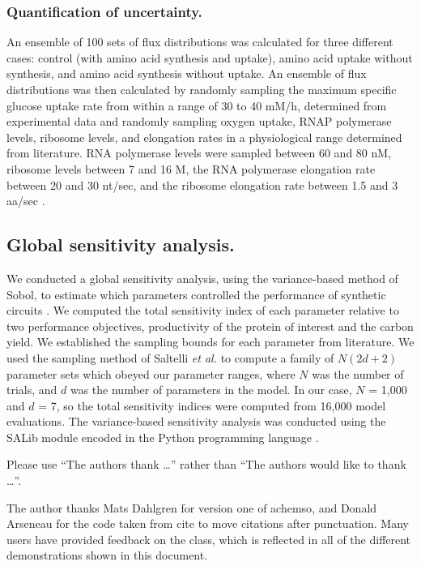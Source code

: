 \documentclass[journal=asbcd6,manuscript=article]{achemso}
\begin{document}
\subsubsection*{Quantification of uncertainty.}
An ensemble of 100 sets of flux distributions was calculated for three different cases: control (with amino acid synthesis and uptake), amino acid uptake without synthesis, and amino acid synthesis without uptake.
An ensemble of flux distributions was then calculated by randomly sampling the maximum specific glucose uptake rate from within a range of 30 to 40 mM/h, determined from experimental data and randomly sampling oxygen uptake, RNAP polymerase levels, ribosome levels, and elongation rates in a physiological range determined from literature.
RNA polymerase levels were sampled between 60 and 80 nM, ribosome levels between 7 and 16 \textmu M, the RNA polymerase elongation rate between 20 and 30 nt/sec, and the ribosome elongation rate between 1.5 and 3 aa/sec \cite{2005_underwood_biotech, Garamella:2016aa}.

\subsection*{Global sensitivity analysis.}
We conducted a global sensitivity analysis, using the variance-based method of Sobol, to estimate which parameters controlled the performance of synthetic circuits \citep{SOBOL_METHOD}.
We computed the total sensitivity index of each parameter relative to two performance objectives, productivity of the protein of interest and the carbon yield.
We established the sampling bounds for each parameter from literature.
We used the sampling method of Saltelli \textit{et al.} \citep{Saltelli:2010} to compute a family of $N\left(2d+2\right)$ parameter sets which obeyed our parameter ranges,
where $N$ was the number of trials, and $d$ was the number of parameters in the model. In our case, $N$ = 1,000 and $d$ = 7, so the total sensitivity indices were computed from
16,000 model evaluations. The variance-based sensitivity analysis was conducted using the SALib module encoded in the Python programming language \citep{SALIB}.

\begin{acknowledgement}

Please use ``The authors thank \ldots'' rather than ``The
authors would like to thank \ldots''.

The author thanks Mats Dahlgren for version one of \textsf{achemso},
and Donald Arseneau for the code taken from \textsf{cite} to move
citations after punctuation. Many users have provided feedback on the
class, which is reflected in all of the different demonstrations
shown in this document.

\end{acknowledgement}
\end{document}

